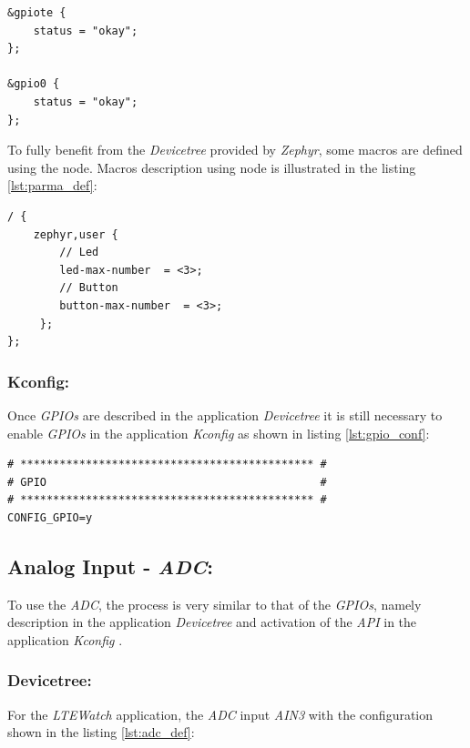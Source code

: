 \documentclass[report.tex]{subfiles}
\begin{document}
\begin{lstlisting}[style=C,label={lst:gpio_def},caption={\textit{DT} \textit{GPIOs} Description}]
&gpiote {
	status = "okay";
};

&gpio0 {
    status = "okay";
};
\end{lstlisting}

\pagebreak

To fully benefit from the \textit{Devicetree} provided by \textit{Zephyr}, some macros are defined using the  node. Macros description using  node is illustrated in the listing \ref{lst:parma_def}:
\begin{lstlisting}[style=C,label={lst:parma_def},caption={\textit{DT} \textit{GPIOs} Proprieties Description}]
/ {
	zephyr,user {
		// Led
		led-max-number  = <3>;
		// Button
		button-max-number  = <3>;
	 };
};
\end{lstlisting}
\subsubsection{Kconfig:}

Once \textit{GPIOs} are described in the application \textit{Devicetree} it is still necessary to enable \textit{GPIOs} in the application \textit{Kconfig} as shown in listing \ref{lst:gpio_conf}:

\begin{lstlisting}[style=console,label={lst:gpio_conf},caption={Application \textit{GPIOs} Configuration}]
# ********************************************* #
# GPIO                                          #
# ********************************************* #
CONFIG_GPIO=y
\end{lstlisting}

\subsection{Analog Input - \textit{ADC}:}
To use the \textit{ADC}, the process is very similar to that of the \textit{GPIOs}, namely description in the application \textit{Devicetree} and activation of the \textit{API} in the application \textit{Kconfig} .
\subsubsection{Devicetree:}

For the \textit{LTEWatch} application, the \textit{ADC} input \textit{AIN3} with the configuration shown in the listing \ref{lst:adc_def}:
\end{document}
